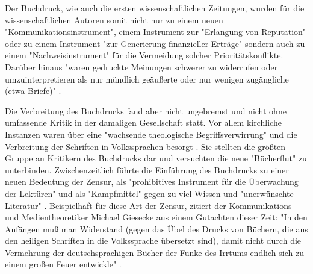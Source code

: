 Der Buchdruck, wie auch die ersten wissenschaftlichen Zeitungen, wurden für die wissenschaftlichen Autoren somit nicht nur zu einem neuen "Kommunikationsinstrument", einem Instrument zur "Erlangung von Reputation" oder zu einem Instrument "zur Generierung finanzieller Erträge" sondern auch zu einem "Nachweisinstrument" \cite{wunderlich_2008_buchdruck} \cite{schirmbacher_2009_wisspub} für die Vermeidung solcher Prioritätskonflikte. Darüber hinaus "waren gedruckte Meinungen schwerer zu widerrufen oder umzuinterpretieren als nur mündlich geäußerte oder nur wenigen zugängliche (etwa Briefe)" \cite{luhmann_1997_gesellschaft}.

Die Verbreitung des Buchdrucks fand aber nicht ungebremst und nicht ohne umfassende Kritik in der damaligen Gesellschaft statt. Vor allem kirchliche Instanzen waren über eine "wachsende theologische Begriffsverwirrung" und die Verbreitung der Schriften in Volkssprachen besorgt \cite{giesecke_1991_buchdruck}. Sie stellten die größten Gruppe an Kritikern des Buchdrucks dar und versuchten die neue "Bücherflut" zu unterbinden\cite{giesecke_1991_buchdruck}. Zwischenzeitlich führte die Einführung des Buchdrucks zu einer neuen Bedeutung der Zensur, als "prohibitives Instrument für die Überwachung der Lektüren" und als "Kampfmittel" \cite{sprachgeschichte_1998_besch} gegen zu viel Wissen \cite{suchen} und "unerwünschte Literatur" \cite{suchen}. Beispielhaft für diese Art der Zensur, zitiert der Kommunikations- und Medientheoretiker Michael Giesecke aus einem Gutachten dieser Zeit: "In den Anfängen muß man Widerstand (gegen das Übel des Drucks von Büchern, die aus den heiligen Schriften in die Volkssprache übersetzt sind), damit nicht durch die Vermehrung der deutschsprachigen Bücher der Funke des Irrtums endlich sich zu einem großen Feuer entwickle" \cite{giesecke_1991_buchdruck}.

